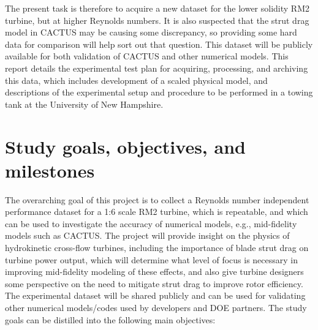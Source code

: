 \documentclass[12pt,letterpaper]{scrreprt}
\begin{document}
The present task is therefore to acquire a new dataset for the lower solidity
RM2 turbine, but at higher Reynolds numbers. It is also suspected that the strut
drag model in CACTUS may be causing some discrepancy, so providing some hard
data for comparison will help sort out that question. This dataset will be
publicly available for both validation of CACTUS and other numerical models.
This report details the experimental test plan for acquiring, processing, and
archiving this data, which includes development of a scaled physical model, and
descriptions of the experimental setup and procedure to be performed in a towing
tank at the University of New Hampshire.


\section{Study goals, objectives, and milestones}

The overarching goal of this project is to collect a Reynolds number independent
performance dataset for a 1:6 scale RM2 turbine, which is repeatable, and which
can be used to investigate the accuracy of numerical models, e.g., mid-fidelity
models such as CACTUS. The project will provide insight on the physics of
hydrokinetic cross-flow turbines, including the importance of blade strut drag
on turbine power output, which will determine what level of focus is necessary
in improving mid-fidelity modeling of these effects, and also give turbine
designers some perspective on the need to mitigate strut drag to improve rotor
efficiency. The experimental dataset will be shared publicly and can be used for
validating other numerical models/codes used by developers and DOE partners. The
study goals can be distilled into the following main objectives:
\end{document}
